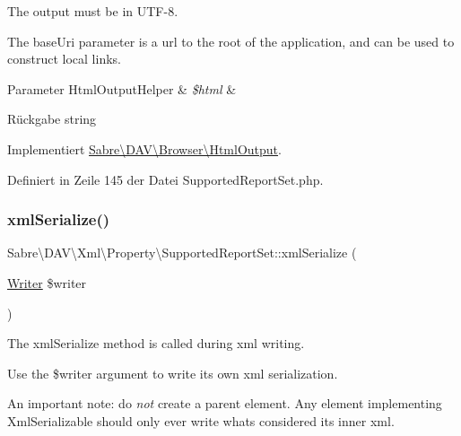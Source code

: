 The output must be in U\+T\+F-\/8.

The base\+Uri parameter is a url to the root of the application, and can be used to construct local links.


\begin{DoxyParams}[1]{Parameter}
Html\+Output\+Helper & {\em \$html} & \\
\hline
\end{DoxyParams}
\begin{DoxyReturn}{Rückgabe}
string 
\end{DoxyReturn}


Implementiert \mbox{\hyperlink{interface_sabre_1_1_d_a_v_1_1_browser_1_1_html_output_a53a24f82474cef8c1fcf00e87de3bf7c}{Sabre\textbackslash{}\+D\+A\+V\textbackslash{}\+Browser\textbackslash{}\+Html\+Output}}.



Definiert in Zeile 145 der Datei Supported\+Report\+Set.\+php.

\mbox{\label{class_sabre_1_1_d_a_v_1_1_xml_1_1_property_1_1_supported_report_set_ae9986a7b7f6f9f08983bc740f6e1b357}} 
\subsubsection{\texorpdfstring{xml\+Serialize()}{xmlSerialize()}}
{\footnotesize\ttfamily Sabre\textbackslash{}\+D\+A\+V\textbackslash{}\+Xml\textbackslash{}\+Property\textbackslash{}\+Supported\+Report\+Set\+::xml\+Serialize (\begin{DoxyParamCaption}\item[{\mbox{\hyperlink{class_sabre_1_1_xml_1_1_writer}{Writer}}}]{\$writer }\end{DoxyParamCaption})}

The xml\+Serialize method is called during xml writing.

Use the \$writer argument to write its own xml serialization.

An important note\+: do {\itshape not} create a parent element. Any element implementing Xml\+Serializable should only ever write what\textquotesingle{}s considered its \textquotesingle{}inner xml\textquotesingle{}.

